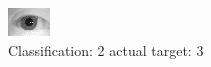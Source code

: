 \begin{figure}[h!]
\begin{center}
\includegraphics[width=0.60\columnwidth]{figures/ID1117_class_2_target_3.png}
\end{center}
\caption{ Classification: 2 actual target: 3}
\label{fig:ID1117_class_2_target_3}
\end{figure}
